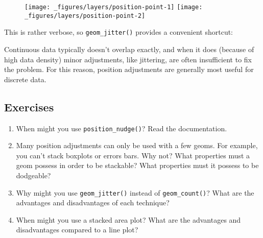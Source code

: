 \begin{Shaded}
\begin{Highlighting}[]
\StringTok{ }
\StringTok{  }\NormalTok{(} \NormalTok{)}
\StringTok{ }
\StringTok{  }\NormalTok{(} \NormalTok{(} \NormalTok{, } \NormalTok{))}
\end{Highlighting}
\end{Shaded}

\begin{figure}[H]
  \texttt{[image: \_figures/layers/position-point-1]}%
  \texttt{[image: \_figures/layers/position-point-2]}
\end{figure}

This is rather verbose, so \texttt{geom\_jitter()} provides a convenient
shortcut:

\begin{Shaded}
\begin{Highlighting}[]
\StringTok{ }
\StringTok{  }\NormalTok{(} \NormalTok{, } \NormalTok{)}
\end{Highlighting}
\end{Shaded}

Continuous data typically doesn't overlap exactly, and when it does
(because of high data density) minor adjustments, like jittering, are
often insufficient to fix the problem. For this reason, position
adjustments are generally most useful for discrete data.

\subsection{Exercises}\label{exercises-4}

\begin{enumerate}
\def\labelenumi{\arabic{enumi}.}
\item
  When might you use \texttt{position\_nudge()}? Read the documentation.
\item
  Many position adjustments can only be used with a few geoms. For
  example, you can't stack boxplots or errors bars. Why not? What
  properties must a geom possess in order to be stackable? What
  properties must it possess to be dodgeable?
\item
  Why might you use \texttt{geom\_jitter()} instead of
  \texttt{geom\_count()}? What are the advantages and disadvantages of
  each technique?
\item
  When might you use a stacked area plot? What are the advantages and
  disadvantages compared to a line plot?
\end{enumerate}

